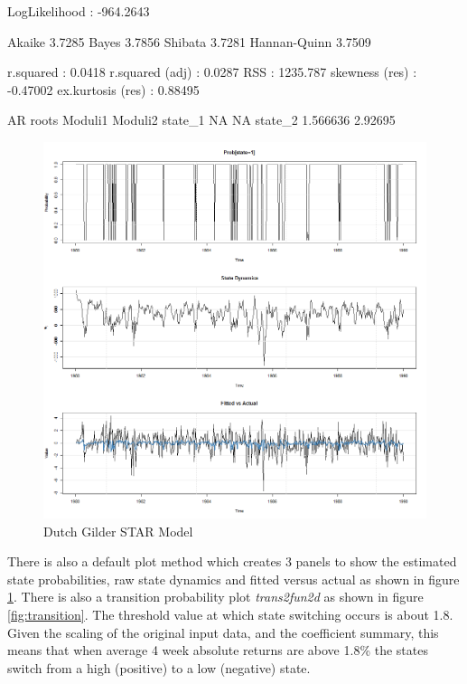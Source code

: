 \begin{Schunk}
\begin{Soutput}
LogLikelihood : -964.2643 
                   
Akaike       3.7285
Bayes        3.7856
Shibata      3.7281
Hannan-Quinn 3.7509

r.squared         :  0.0418
r.squared (adj)   :  0.0287
RSS               :  1235.787
skewness (res)    :  -0.47002
ex.kurtosis (res) :  0.88495

AR roots
         Moduli1 Moduli2
state_1       NA      NA
state_2 1.566636 2.92695
\end{Soutput}
\end{Schunk}
\begin{figure}
\centering
\includegraphics[scale=0.2]{fx_plot}
\caption{Dutch Gilder STAR Model}
\label{fig:guilder}
\end{figure}
There is also a default plot method which creates 3 panels to show the estimated
state probabilities, raw state dynamics and fitted versus actual as shown in
figure \ref{fig:guilder}. There is also a transition probability plot
\emph{trans2fun2d} as shown in figure \ref{fig:transition}. The threshold value
at which state switching occurs is about 1.8. Given the scaling of the original 
input data, and the coefficient summary, this means that when average 4 week 
absolute returns are above 1.8\% the states switch from a high (positive) to a
low (negative) state.

